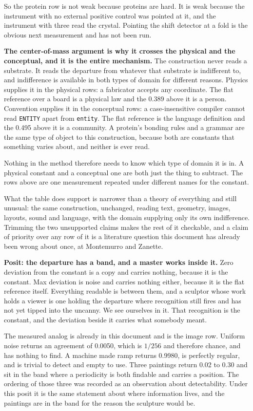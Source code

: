 So the protein row is not weak because proteins are hard. It is weak because the instrument with no external positive control was pointed at it, and the instrument with three read the crystal. Pointing the shift detector at a fold is the obvious next measurement and has not been run.

\textbf{The center-of-mass argument is why it crosses the physical and the conceptual, and it is the entire mechanism.} The construction never reads a substrate. It reads the departure from whatever that substrate is indifferent to, and indifference is available in both types of domain for different reasons. Physics supplies it in the physical rows: a fabricator accepts any coordinate. The flat reference over a board is a physical law and the 0.389 above it is a person. Convention supplies it in the conceptual rows: a case-insensitive compiler cannot read \texttt{ENTITY} apart from \texttt{entity}. The flat reference is the language definition and the 0.495 above it is a community. A protein's bonding rules and a grammar are the same type of object to this construction, because both are constants that something varies about, and neither is ever read.

Nothing in the method therefore needs to know which type of domain it is in. A physical constant and a conceptual one are both just the thing to subtract. The rows above are one measurement repeated under different names for the constant.

What the table does support is narrower than a theory of everything and still unusual: the same construction, unchanged, reading text, geometry, images, layouts, sound and language, with the domain supplying only its own indifference. Trimming the two unsupported claims makes the rest of it checkable, and a claim of priority over any row of it is a literature question this document has already been wrong about once, at Montemurro and Zanette.

\textbf{Posit: the departure has a band, and a master works inside it.} Zero deviation from the constant is a copy and carries nothing, because it is the constant. Max deviation is noise and carries nothing either, because it is the flat reference itself. Everything readable is between them, and a sculptor whose work holds a viewer is one holding the departure where recognition still fires and has not yet tipped into the uncanny. We see ourselves in it. That recognition is the constant, and the deviation beside it carries what somebody meant.

The measured analog is already in this document and is the image row. Uniform noise returns an agreement of 0.0050, which is \(1/256\) and therefore chance, and has nothing to find. A machine made ramp returns 0.9980, is perfectly regular, and is trivial to detect and empty to use. Three paintings return 0.02 to 0.30 and sit in the band where a periodicity is both findable and carries a position. The ordering of those three was recorded as an observation about detectability. Under this posit it is the same statement about where information lives, and the paintings are in the band for the reason the sculpture would be.

